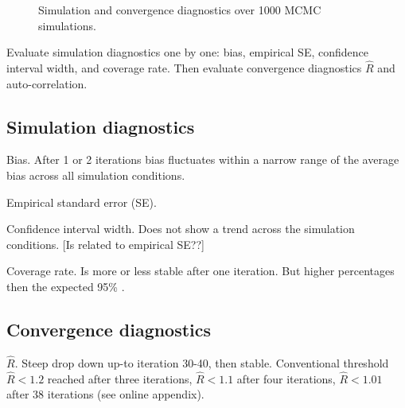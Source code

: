 \documentclass[article]{jss}
\begin{document}
\begin{figure}[h]
  \caption{Simulation and convergence diagnostics over 1000 MCMC simulations.}
    \label{resultssim}
\end{figure}

Evaluate simulation diagnostics one by one: bias, empirical SE, confidence interval width, and coverage rate. Then evaluate convergence diagnostics $\widehat{R}$ and auto-correlation.

\subsection{Simulation diagnostics}
Bias. After 1 or 2 iterations bias fluctuates within a narrow range of the average bias across all simulation conditions.

Empirical standard error (SE).


Confidence interval width. Does not show a trend across the simulation conditions. [Is related to empirical SE??]


Coverage rate. Is more or less stable after one iteration. But higher percentages then the expected 95\% \cite{neym43}.

\subsection{Convergence diagnostics}

$\widehat{R}$. Steep drop down up-to iteration 30-40, then stable. Conventional threshold $\widehat{R} < 1.2$ reached after three iterations, $\widehat{R} < 1.1$ after four iterations, $\widehat{R} < 1.01$ after 38 iterations (see online appendix). 
\end{document}

